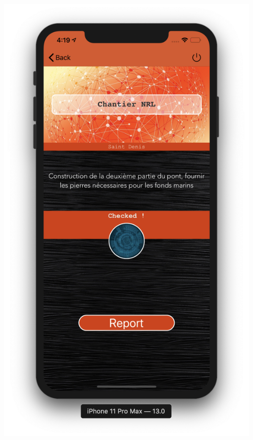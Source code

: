 \documentclass{article}
\begin{document}
\begin{center}
  \includegraphics[scale=0.2]{DetailMissionIOS.png}

\end{center}
\end{document}

